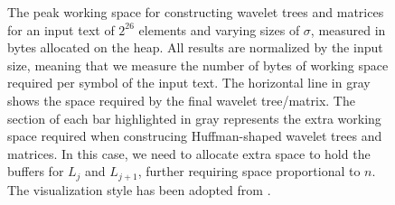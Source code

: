 \documentclass[a4]{article}
\begin{document}
\begin{figure}[t]
\begin{center}
\begin{tikzpicture}
        \end{tikzpicture}
\end{center}             
\caption{
    The peak working space for constructing wavelet trees and matrices for an input text of $2^{26}$ elements and varying sizes of $\sigma$, measured in bytes allocated on the heap.
    All results are normalized by the input size, meaning that we measure the number of bytes of working space required per symbol of the input text.
    The horizontal line in gray shows the space required by the final wavelet tree/matrix.
    The section of each bar highlighted in gray represents the extra working space required when construcing Huffman-shaped wavelet trees and matrices.
    In this case, we need to allocate extra space to hold the buffers for $L_j$ and $L_{j + 1}$, further requiring space proportional to $n$.
    The visualization style has been adopted from \cite{fischer21}.
} 
\label{fig:eval-space-st}
\end{figure}
\end{document}
